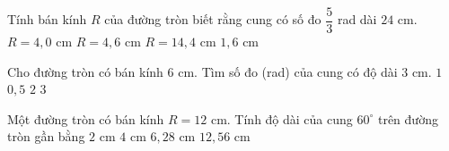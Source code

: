 \begin{ex}%
	Tính bán kính $R$ của đường tròn biết rằng cung có số đo $\dfrac{5}{3}$ rad dài $24$ cm.
	\choice
	{$R=4{,}0$ cm}
	{$R=4{,}6$ cm}
	{\True $R=14{,}4$ cm}
	{$1{,}6$ cm}
\end{ex}
\begin{ex}%
	Cho đường tròn có bán kính $6$ cm. Tìm số đo (rad) của cung có độ dài $3$ cm.
	\choice
	{$1$}
	{\True $0{,}5$}
	{$2$}
	{$3$}
\end{ex}

\begin{ex}%
	Một đường tròn có bán kính $R=12$ cm. Tính độ dài của cung $60^\circ$ trên đường tròn gần bằng
	\choice
	{$2$ cm}
	{$4$ cm}
	{$6{,}28$ cm}
	{\True $12{,}56$ cm}
\end{ex}


